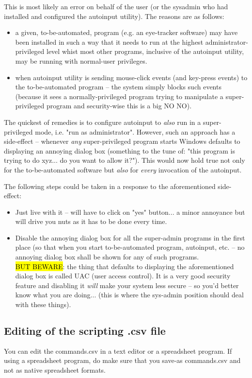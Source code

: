 \documentclass[12pt,a4paper]{article}
\begin{document}
This is most likely an error on behalf of the user (or the sysadmin who had installed and configured the autoinput utility). The reasons are as follows:
\begin{itemize}
\item a given, to-be-automated, program (e.g. an eye-tracker software) may have been installed in such a way that it needs to run at the highest administrator-privileged level whist most other programs, inclusive of the autoinput utility, may be running with normal-user privileges.

\item when autoinput utility is sending mouse-click events (and key-press events) to the to-be-automated program -- the system simply blocks such events (because it sees a normally-privileged program trying to manipulate a super-privileged program and security-wise this is a big NO NO).
\end{itemize}

The quickest of remedies is to configure autoinput to \textit{also} run in a super-privileged mode, i.e. "run as administrator".
However, such an approach has a side-effect -- whenever \textit{any} super-privileged program starts Windows\textsuperscript{\textregistered} defaults to displaying an annoying dialog box (something to the tune of: "this program is trying to do xyz... do you want to allow it?"). This would now hold true not only for the to-be-automated software but \textit{also} for \textit{every} invocation of the autoinput. 

The following steps could be taken in a response to the aforementioned side-effect:
\begin{itemize}
\item Just live with it -- will have to click on "yes" button... a minor annoyance but will drive you nuts as it has to be done every time.
\item Disable the annoying dialog box for all the super-admin programs in the first place (so that when you start to-be-automated program, autoinput, etc. -- no annoying dialog box shall be shown for any of such programs. \\ 
\hl{BUT BEWARE}: the thing that defaults to displaying the aforementioned dialog box is called UAC (user access control). It is a very good security feature and disabling it \textit{will} make your system less secure -- so you'd better know what you are doing... (this is where the sys-admin position should deal with these things).

\end{itemize}

\subsection{Editing of the scripting .csv file}
You can edit the commands.csv in a text editor or a spreadsheet program. If using a spreadsheet program, do make sure that you save-as commands.csv and not as native spreadsheet formats.
\end{document}
